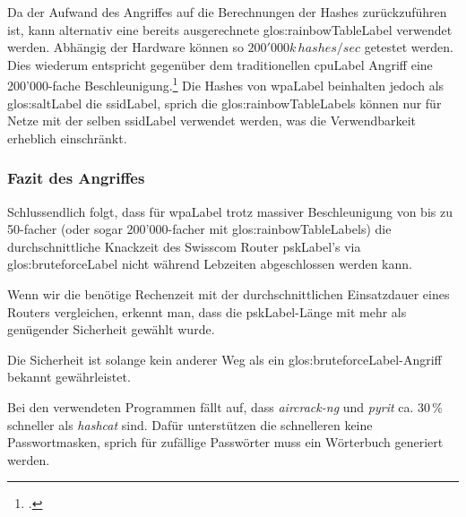 Da der Aufwand des Angriffes auf die Berechnungen der Hashes zurückzuführen ist, kann alternativ eine bereits ausgerechnete \gls{glos:rainbowTableLabel} verwendet werden.
Abhängig der Hardware können so $200'000k\,hashes/sec$ getestet werden. Dies wiederum entspricht gegenüber dem traditionellen \gls{cpuLabel} Angriff eine 200'000-fache Beschleunigung.\footcite[][160]{WrightCache201503}
Die Hashes von \gls{wpaLabel} beinhalten jedoch als \gls{glos:saltLabel} die \gls{ssidLabel}, sprich die \glspl{glos:rainbowTableLabel} können nur für Netze mit der selben \gls{ssidLabel} verwendet werden, was die Verwendbarkeit erheblich einschränkt.


\subsubsection{Fazit des Angriffes}
Schlussendlich folgt, dass für \gls{wpaLabel} trotz massiver Beschleunigung von bis zu 50-facher (oder sogar 200'000-facher mit \glspl{glos:rainbowTableLabel}) die durchschnittliche Knackzeit des Swisscom Router \gls{pskLabel}'s via \gls{glos:bruteforceLabel} nicht während Lebzeiten abgeschlossen werden kann.

Wenn wir die benötige Rechenzeit mit der durchschnittlichen Einsatzdauer eines Routers vergleichen, erkennt man, dass die \gls{pskLabel}-Länge mit mehr als genügender Sicherheit gewählt wurde.

Die Sicherheit ist solange kein anderer Weg als ein \gls{glos:bruteforceLabel}-Angriff bekannt gewährleistet.

Bei den verwendeten Programmen fällt auf, dass \textit{aircrack-ng} und \textit{pyrit} ca. 30\,\% schneller als \textit{hashcat} sind. Dafür unterstützen die schnelleren keine Passwortmasken, sprich für zufällige Passwörter muss ein Wörterbuch generiert werden.
